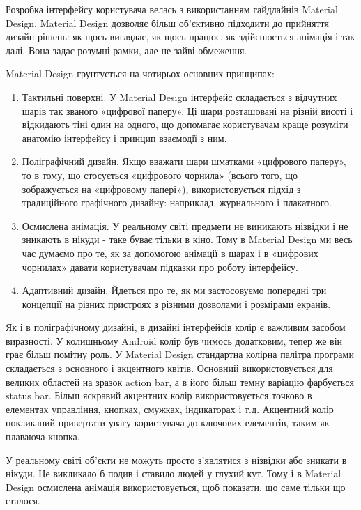 \documentclass[../main.tex]{subfiles}
\begin{document}
			Розробка інтерфейсу користувача велась з використанням гайдлайнів Material Design.\cite{material_design} Material Design дозволяє більш об'єктивно підходити до прийняття дизайн-рішень: як щось виглядає, як щось працює, як здійснюється анімація і так далі. Вона задає розумні рамки, але не зайві обмеження.
			
			Material Design грунтується на чотирьох основних принципах:
			\begin{enumerate}
				\item Тактильні поверхні. У Material Design інтерфейс складається з відчутних шарів так званого «цифрової паперу». Ці шари розташовані на різній висоті і відкидають тіні один на одного, що допомагає користувачам краще розуміти анатомію інтерфейсу і принцип взаємодії з ним.
				\item Поліграфічний дизайн. Якщо вважати шари шматками «цифрового паперу», то в тому, що стосується «цифрового чорнила» (всього того, що зображується на «цифровому папері»), використовується підхід з традиційного графічного дизайну: наприклад, журнального і плакатного.
				\item Осмислена анімація. У реальному світі предмети не виникають нізвідки і не зникають в нікуди - таке буває тільки в кіно. Тому в Material Design ми весь час думаємо про те, як за допомогою анімації в шарах і в «цифрових чорнилах» давати користувачам підказки про роботу інтерфейсу.
				\item Адаптивний дизайн. Йдеться про те, як ми застосовуємо попередні три концепції на різних пристроях з різними дозволами і розмірами екранів.
			\end{enumerate}
			
			Як і в поліграфічному дизайні, в дизайні інтерфейсів колір є важливим засобом виразності. У колишньому Android колір був чимось додатковим, тепер же він грає більш помітну роль. У Material Design стандартна колірна палітра програми складається з основного і акцентного квітів. Основний використовується для великих областей на зразок action bar, а в його більш темну варіацію фарбується status bar. Більш яскравий акцентних колір використовується точково в елементах управління, кнопках, смужках, індикаторах і т.д. Акцентний колір покликаний привертати увагу користувача до ключових елементів, таким як плаваюча кнопка.
			
			У реальному світі об'єкти не можуть просто з'являтися з нізвідки або зникати в нікуди. Це викликало б подив і ставило людей у глухий кут. Тому і в Material Design осмислена анімація використовується, щоб показати, що саме тільки що сталося.
			
\end{document}
